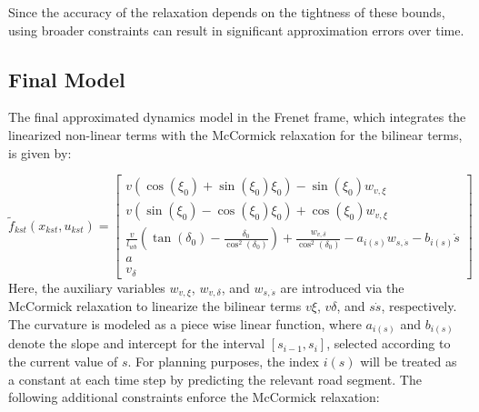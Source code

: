 Since the accuracy of the relaxation depends on the tightness of these bounds, using broader constraints can result in significant approximation
errors over time.

\subsection{Final Model} \label{subsec:bicycle_resulting_model}

The final approximated dynamics model in the Frenet frame, which integrates the linearized non-linear terms with the McCormick relaxation for the bilinear terms, is given by:

\begin{equation}
	\label{eq:kst_final_dynamics}
	\tilde{f}_{kst}(x_{kst}, u_{kst}) =
	\begin{bmatrix}
		v (\cos(\xi_0) + \sin(\xi_0)\xi_0) - \sin(\xi_0) w_{v,\xi}                                                                                                 \\[8pt]
		v (\sin(\xi_0) - \cos(\xi_0)\xi_0) + \cos(\xi_0) w_{v,\xi}                                                                                                 \\[8pt]
		\frac{v}{l_{wb}} (\tan(\delta_0) - \frac{\delta_0}{\cos^2(\delta_0)}) + \frac{w_{v,\delta}}{\cos^2(\delta_0)}  - a_{i(s)} w_{s,\dot{s}} - b_{i(s)} \dot{s} \\[8pt]
		a                                                                                                                                                          \\[8pt]
		v_\delta
	\end{bmatrix}
\end{equation}
Here, the auxiliary variables $w_{v,\xi}$, $w_{v,\delta}$, and $w_{s,\dot{s}}$ are introduced via the McCormick relaxation to linearize the bilinear
terms $v\xi$, $v\delta$, and $s\dot{s}$, respectively.
The curvature is modeled as a piece wise linear function, where $a_{i(s)}$ and $b_{i(s)}$ denote the slope and intercept for the interval $[s_{i-1},
			s_i]$, selected according to the current value of $s$.
For planning purposes, the index $i(s)$ will be treated as a constant at each time step by predicting the relevant road segment.
The following additional constraints enforce the McCormick relaxation:
